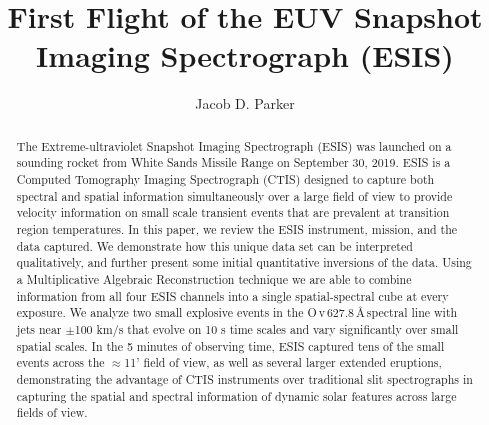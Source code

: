 \renewcommand{\arcsec}{$^{\prime\prime}$} %
\renewcommand{\arcmin}{$^{\prime}$}
\newcommand{\rts}[1]{{\color{violet} RTS: #1}} %
\newcommand{\jdp}[1]{{\color{red} JDP: #1}} %
\newcommand{\cck}[1]{{\color{brown} CCK: #1}} %
\newcommand{\amy}[1]{{\color{cyan} ARW: #1}}

\newcommand{\spectralline}[3]{#1\,{\sc #2}\,#3\,\AA \,}
\newcommand{\ov}{\spectralline{O}{v}{627.8}}
\newcommand{\mgxbright}{\spectralline{Mg}{x}{609.8}}
\newcommand{\hei}{\spectralline{He}{i}{584.3}}
\newcommand{\heii}{\spectralline{He}{ii}{304}}



\title{First Flight of the EUV Snapshot Imaging Spectrograph (ESIS)}

\author{Jacob D. Parker}

\begin{abstract}
  	The Extreme-ultraviolet Snapshot Imaging Spectrograph (ESIS) was launched on a sounding rocket from White Sands Missile Range on September 30, 2019.
  	ESIS is a Computed Tomography Imaging Spectrograph (CTIS) designed to capture both spectral and spatial information simultaneously over a large field of view to provide velocity information on small scale transient events that are prevalent at transition region temperatures.
  	In this paper, we review the ESIS instrument, mission, and the data captured.
  	We demonstrate how this unique data set can be interpreted qualitatively, and further present some initial quantitative inversions of the data.
  	Using a Multiplicative Algebraic Reconstruction technique we are able to combine information from all four ESIS channels into a single spatial-spectral cube at every exposure.
  	We analyze two small explosive events in the \ov spectral line with jets  near $\pm$100 km/s that evolve on 10 s time scales and vary significantly over small spatial scales.
  	In the 5 minutes of observing time, ESIS captured tens of the small events across the $\approx$11' field of view, as well as several larger extended eruptions, demonstrating the advantage of CTIS instruments over traditional slit spectrographs in capturing the spatial and spectral information of dynamic solar features across large fields of view.
  	
\end{abstract} 

